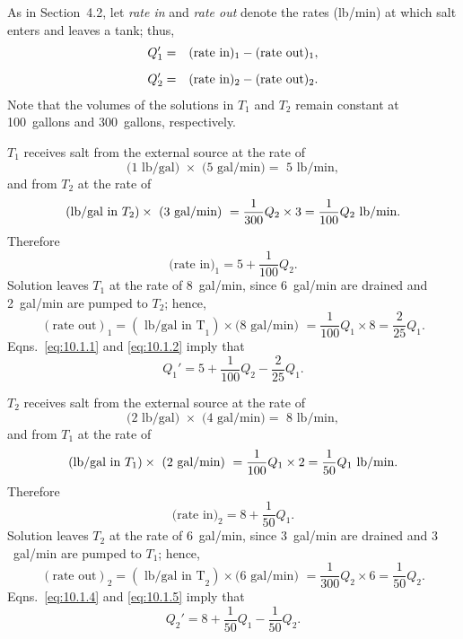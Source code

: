 \begin{examplesolution}
\solution As in Section~4.2, let {\color{blue}\it rate in\/} and {\color{blue}\it rate out\/} denote
the rates (lb/min) at which salt enters and leaves a tank; thus,
\begin{eqnarray*}
  Q_{1}' & = & (\mbox{rate in})_{1}-(\mbox{rate out})_{1}, \\[2\jot]
  Q_{2}' & = & (\mbox{rate in})_{2}-(\mbox{rate out})_{2}.
\end{eqnarray*}
Note that the volumes of the solutions in $T_{1}$ and $T_{2}$ remain constant at 100~gallons and
300~gallons, respectively.

$T_{1}$ receives salt from the external source at the rate of
\[
  \mbox{(1 lb/gal) }\times\mbox{ (5~gal/min)}=\mbox{ 5 lb/min},
\]
and from $T_{2}$ at the rate of
\[
  \mbox{(lb/gal in }T_{2})\times\mbox{ (3~gal/min) }=\frac{1}{300}Q_{2}\times3\\[2\jot]=\frac{1}{100}Q_{2}\mbox{ lb/min}.
\]
Therefore
\begin{equation}
  \label{eq:10.1.1}\mbox{(rate in)}_{1}=5+\frac{1}{100}Q_{2}.
\end{equation}
Solution leaves $T_{1}$ at the rate of 8~gal/min, since 6~gal/min are drained and 2~gal/min are
pumped to $T_{2}$; hence,
\begin{equation}
  \label{eq:10.1.2}(\mbox{rate out})_{1}=(\mbox{ lb/gal in T}_{1})\times\mbox{(8~gal/min) }=\frac{1}{100}Q_{1}\times8=\frac{2}{25}Q_{1}.
\end{equation}
Eqns.~\eqref{eq:10.1.1} and \eqref{eq:10.1.2} imply that
\begin{equation}
  \label{eq:10.1.3}Q_{1}'=5+\frac{1}{100}Q_{2}-\frac{2}{25}Q_{1}.
\end{equation}

$T_{2}$ receives salt from the external source at the rate of
\[
  \mbox{(2 lb/gal) }\times\mbox{ (4~gal/min)}=\mbox{ 8 lb/min},
\]
and from $T_{1}$ at the rate of
\[
  \mbox{(lb/gal in }T_{1})\times\mbox{ (2~gal/min) }=\frac{1}{100}Q_{1}\times2\\[2\jot]=\frac{1}{50}Q_{1}\mbox{ lb/min}.
\]
Therefore
\begin{equation}
  \label{eq:10.1.4}\mbox{(rate in)}_{2}=8+\frac{1}{50}Q_{1}.
\end{equation}
Solution leaves $T_{2}$ at the rate of $6$~gal/min, since $3$~gal/min are drained and $3$~gal/min
are pumped to $T_{1}$; hence,
\begin{equation}
  \label{eq:10.1.5}(\mbox{rate out})_{2}=(\mbox{ lb/gal in T}_{2})\times\mbox{(6~gal/min) }=\frac{1}{300}Q_{2}\times6=\frac{1}{50}Q_{2}.
\end{equation}
Eqns.~\eqref{eq:10.1.4} and \eqref{eq:10.1.5} imply that
\begin{equation}
  \label{eq:10.1.6}Q_{2}'=8+\frac{1}{50}Q_{1}-\frac{1}{50}Q_{2}.
\end{equation}


\end{examplesolution}
